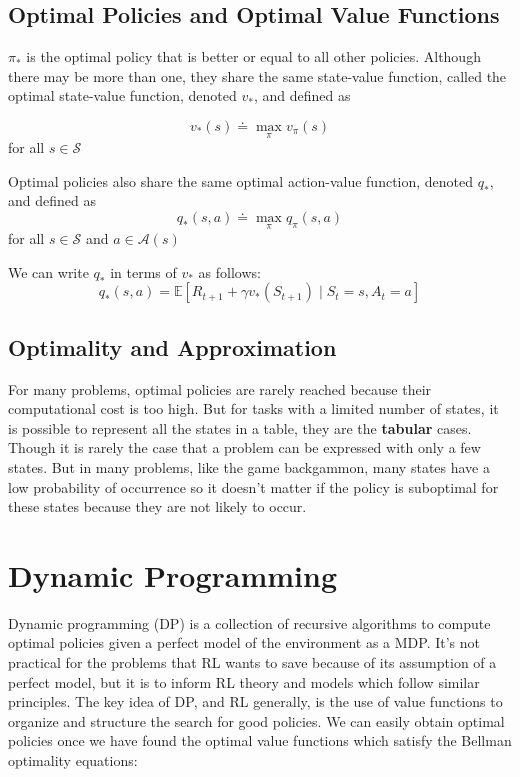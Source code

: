 \documentclass[11pt]{article}
\begin{document}
\subsection{Optimal Policies and Optimal Value Functions}
\label{sec:org9df5649}

\(\pi_{*}\) is the optimal policy that is better or equal to all other policies.
Although there may be more than one, they share the same state-value function,
called the optimal state-value function, denoted \(v_{*}\), and defined as

\begin{equation}
v_{*}(s) \doteq \max_{\pi} v_{\pi}(s)
\end{equation}
for all \(s \in \mathcal{S}\)

Optimal policies also share the same optimal action-value function, denoted
\(q_{*}\), and defined as
\begin{equation}
q_{*}(s,a) \doteq \max_{\pi} q_{\pi}(s,a)
\end{equation}
for all \(s \in \mathcal{S}\) and \(a \in \mathcal{A}(s)\)

We can write \(q_{*}\) in terms of \(v_{*}\) as follows:
\begin{equation}
q_{*}(s,a) = \mathbb{E} [R_{t+1} + \gamma v_{*}(S_{t+1}) \mid S_{t} = s, A_{t} = a]
\end{equation}

\subsection{Optimality and Approximation}
\label{sec:org382737c}

For many problems, optimal policies are rarely reached because their
computational cost is too high. But for tasks with a limited number of states,
it is possible to represent all the states in a table, they are the \textbf{tabular}
cases. Though it is rarely the case that a problem can be expressed with only a
few states. But in many problems, like the game backgammon, many states have a
low probability of occurrence so it doesn't matter if the policy is suboptimal
for these states because they are not likely to occur.

\section{Dynamic Programming}
\label{sec:orge448b73}

Dynamic programming (DP) is a collection of recursive algorithms to compute
optimal policies given a perfect model of the environment as a MDP. It's not
practical for the problems that RL wants to save because of its assumption of a
perfect model, but it is to inform RL theory and models which follow similar
principles. The key idea of DP, and RL generally, is the use of value functions
to organize and structure the search for good policies. We can easily obtain
optimal policies once we have found the optimal value functions which satisfy
the Bellman optimality equations:
\end{document}
